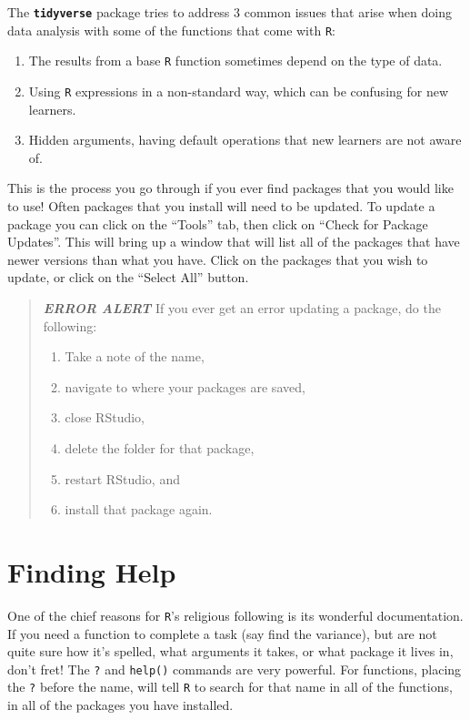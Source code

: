 \documentclass[
  10pt,
  letterpaper,
  twoside,
  openright]{book}
\providecommand{\tightlist}{%
  \setlength{\itemsep}{0pt}\setlength{\parskip}{0pt}}
\begin{document}
The \textbf{\texttt{tidyverse}} package tries to address 3 common issues
that arise when doing data analysis with some of the functions that come
with \texttt{R}:

\begin{enumerate}
\def\labelenumi{\arabic{enumi}.}
\tightlist
\item
  The results from a base \texttt{R} function sometimes depend on the
  type of data.
\item
  Using \texttt{R} expressions in a non-standard way, which can be
  confusing for new learners.
\item
  Hidden arguments, having default operations that new learners are not
  aware of.
\end{enumerate}

This is the process you go through if you ever find packages that you
would like to use! Often packages that you install will need to be
updated. To update a package you can click on the ``Tools'' tab, then
click on ``Check for Package Updates''. This will bring up a window that
will list all of the packages that have newer versions than what you
have. Click on the packages that you wish to update, or click on the
``Select All'' button.

\begin{quote}
\textbf{\emph{ERROR ALERT}} If you ever get an error updating a package,
do the following:

\begin{enumerate}
\def\labelenumi{\arabic{enumi}.}
\tightlist
\item
  Take a note of the name,
\item
  navigate to where your packages are saved,
\item
  close RStudio,
\item
  delete the folder for that package,
\item
  restart RStudio, and
\item
  install that package again.
\end{enumerate}
\end{quote}

\hypertarget{finding-help}{%
\section{Finding Help}\label{finding-help}}

One of the chief reasons for \texttt{R}'s religious following is its
wonderful documentation. If you need a function to complete a task (say
find the variance), but are not quite sure how it's spelled, what
arguments it takes, or what package it lives in, don't fret! The
\texttt{?} and \texttt{help()} commands are very powerful. For
functions, placing the \texttt{?} before the name, will tell \texttt{R}
to search for that name in all of the functions, in all of the packages
you have installed.
\end{document}

